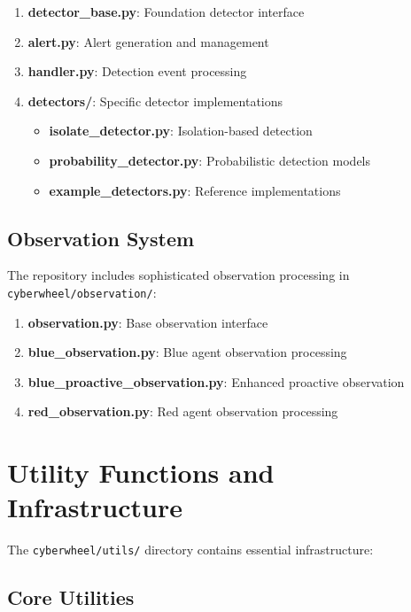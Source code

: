 \documentclass[12pt,a4paper]{article}
\begin{document}
\begin{enumerate}
    \item \textbf{detector\_base.py}: Foundation detector interface
    \item \textbf{alert.py}: Alert generation and management
    \item \textbf{handler.py}: Detection event processing
    \item \textbf{detectors/}: Specific detector implementations
    \begin{itemize}
        \item \textbf{isolate\_detector.py}: Isolation-based detection
        \item \textbf{probability\_detector.py}: Probabilistic detection models
        \item \textbf{example\_detectors.py}: Reference implementations
    \end{itemize}
\end{enumerate}

\subsection{Observation System}

The repository includes sophisticated observation processing in \texttt{cyberwheel/observation/}:

\begin{enumerate}
    \item \textbf{observation.py}: Base observation interface
    \item \textbf{blue\_observation.py}: Blue agent observation processing
    \item \textbf{blue\_proactive\_observation.py}: Enhanced proactive observation
    \item \textbf{red\_observation.py}: Red agent observation processing
\end{enumerate}

\section{Utility Functions and Infrastructure}

The \texttt{cyberwheel/utils/} directory contains essential infrastructure:

\subsection{Core Utilities}
\end{document}
